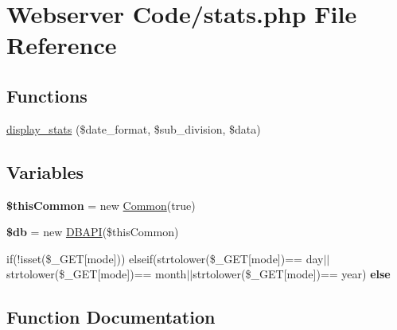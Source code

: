 \hypertarget{stats_8php}{}\section{Webserver Code/stats.php File Reference}
\label{stats_8php}
\subsection*{Functions}
\begin{DoxyCompactItemize}
\item 
\hyperlink{stats_8php_aadb6c25cd1cea1971104d049c282b778}{display\+\_\+stats} (\$date\+\_\+format, \$sub\+\_\+division, \$data)
\end{DoxyCompactItemize}
\subsection*{Variables}
\begin{DoxyCompactItemize}
\item 
{\bfseries \$this\+Common} = new \hyperlink{class_common}{Common}(true)\hypertarget{stats_8php_a2dc37683cec5a169d791007363950944}{}\label{stats_8php_a2dc37683cec5a169d791007363950944}

\item 
{\bfseries \$db} = new \hyperlink{class_d_b_a_p_i}{D\+B\+A\+PI}(\$this\+Common)\hypertarget{stats_8php_a1fa3127fc82f96b1436d871ef02be319}{}\label{stats_8php_a1fa3127fc82f96b1436d871ef02be319}

\item 
if(!isset(\$\+\_\+\+G\+ET\mbox{[}\textquotesingle{}mode\textquotesingle{}\mbox{]})) elseif(strtolower(\$\+\_\+\+G\+ET\mbox{[}\textquotesingle{}mode\textquotesingle{}\mbox{]})== \textquotesingle{}day\textquotesingle{}$\vert$$\vert$strtolower(\$\+\_\+\+G\+ET\mbox{[}\textquotesingle{}mode\textquotesingle{}\mbox{]})== \textquotesingle{}month\textquotesingle{}$\vert$$\vert$strtolower(\$\+\_\+\+G\+ET\mbox{[}\textquotesingle{}mode\textquotesingle{}\mbox{]})== \textquotesingle{}year\textquotesingle{}) {\bfseries else}
\end{DoxyCompactItemize}


\subsection{Function Documentation}
